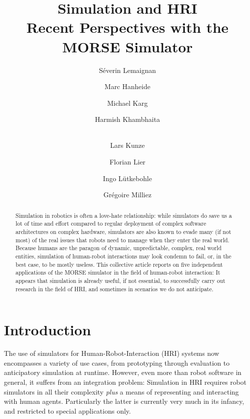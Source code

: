\documentclass{llncs}
\begin{document}
\title{Simulation and HRI\\Recent Perspectives with the MORSE Simulator}

\author{
Séverin Lemaignan \and 
Marc Hanheide \and 
Michael Karg \and 
Harmish Khambhaita \and \\
Lars Kunze \and 
Florian Lier \and 
Ingo Lütkebohle \and 
Grégoire Milliez
}





\maketitle

\begin{abstract}

Simulation in robotics is often a love-hate relationship: while simulators do
save us a lot of time and effort compared to regular deployment of complex
software architectures on complex hardware, simulators are also known to evade
many (if not most) of the real issues that robots need to manage when they enter
the real world.  Because humans are the paragon of dynamic, unpredictable,
complex, real world entities, simulation of human-robot interactions may look
condemn to fail, or, in the best case, to be mostly useless. This collective
article reports on five independent applications of the MORSE simulator in the
field of human-robot interaction: It appears that simulation is already useful,
if not essential, to successfully carry out research in the field of HRI, and
sometimes in scenarios we do not anticipate.

\end{abstract}

\section{Introduction}

The use of simulators for Human-Robot-Interaction (HRI) systems now encompasses 
a variety of use cases, from prototyping through evaluation
to anticipatory simulation at runtime. However, even more than robot software
in general, it suffers from an integration problem: Simulation in HRI requires
robot simulators in all their complexity \emph{plus} a means of representing 
and interacting with
human agents. Particularly the latter is currently very much in its infancy,
and restricted to special applications only.
\end{document}
